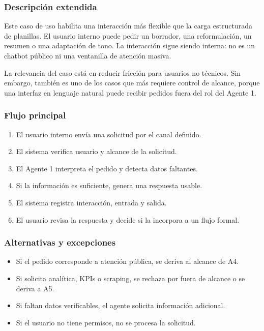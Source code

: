\documentclass[11pt,a4paper]{article}
\begin{document}
\subsubsection{Descripción extendida}

Este caso de uso habilita una interacción más flexible que la carga estructurada de planillas. El usuario interno puede pedir un borrador, una reformulación, un resumen o una adaptación de tono. La interacción sigue siendo interna: no es un chatbot público ni una ventanilla de atención masiva.

La relevancia del caso está en reducir fricción para usuarios no técnicos. Sin embargo, también es uno de los casos que más requiere control de alcance, porque una interfaz en lenguaje natural puede recibir pedidos fuera del rol del Agente 1.

\subsubsection{Flujo principal}

\begin{enumerate}
  \item El usuario interno envía una solicitud por el canal definido.
  \item El sistema verifica usuario y alcance de la solicitud.
  \item El Agente 1 interpreta el pedido y detecta datos faltantes.
  \item Si la información es suficiente, genera una respuesta usable.
  \item El sistema registra interacción, entrada y salida.
  \item El usuario revisa la respuesta y decide si la incorpora a un flujo formal.
\end{enumerate}

\subsubsection{Alternativas y excepciones}

\begin{itemize}
  \item Si el pedido corresponde a atención pública, se deriva al alcance de A4.
  \item Si solicita analítica, KPIs o scraping, se rechaza por fuera de alcance o se deriva a A5.
  \item Si faltan datos verificables, el agente solicita información adicional.
  \item Si el usuario no tiene permisos, no se procesa la solicitud.
\end{itemize}
\end{document}
